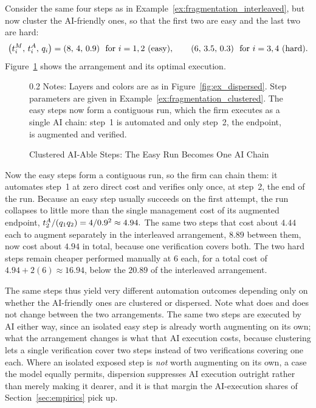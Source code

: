 \begin{example}
\label{ex:fragmentation_clustered}
Consider the same four steps as in Example~\ref{ex:fragmentation_interleaved}, but now cluster the AI-friendly ones, so that the first two are easy and the last two are hard:
\[ \bigl(\manualTime{i},\, \AItime{i},\, q_i\bigr) = (8,\,4,\,0.9) \ \text{ for $i = 1, 2$ (easy)}, \qquad (6,\,3.5,\,0.3) \ \text{ for $i = 3, 4$ (hard)}. \]
Figure~\ref{fig:ex_clustered} shows the arrangement and its optimal execution.
\begin{figure}[!t]
\caption{Clustered AI-Able Steps: The Easy Run Becomes One AI Chain}
\label{fig:ex_clustered}
\centering

\par\vspace{\fignotesskip}
\begin{minipage}{1\linewidth}
\begin{spacing}{0.2}
{\fontsize{9.5pt}{10pt}\selectfont Notes: Layers and colors are as in Figure~\ref{fig:ex_dispersed}. Step parameters are given in Example~\ref{ex:fragmentation_clustered}. The easy steps now form a contiguous run, which the firm executes as a single AI chain: step~1 is automated and only step~2, the endpoint, is augmented and verified.}
\end{spacing}
\end{minipage}
\end{figure}

Now the easy steps form a contiguous run, so the firm can chain them: it automates step~1 at zero direct cost and verifies only once, at step~2, the end of the run.
Because an easy step usually succeeds on the first attempt, the run collapses to little more than the single management cost of its augmented endpoint, $t^{A}_{2}/(q_1 q_2) = 4/0.9^2 \approx 4.94.$
The same two steps that cost about $4.44$ each to augment separately in the interleaved arrangement, $8.89$ between them, now cost about $4.94$ in total, because one verification covers both.
The two hard steps remain cheaper performed manually at $6$ each, for a total cost of $4.94 + 2(6) \approx 16.94$, below the $20.89$ of the interleaved arrangement.
\end{example}

The same steps thus yield very different automation outcomes depending only on whether the AI-friendly ones are clustered or dispersed.
Note what does and does not change between the two arrangements.
The same two steps are executed by AI either way, since an isolated easy step is already worth augmenting on its own; what the arrangement changes is what that AI execution costs, because clustering lets a single verification cover two steps instead of two verifications covering one each.
Where an isolated exposed step is \emph{not} worth augmenting on its own, a case the model equally permits, dispersion suppresses AI execution outright rather than merely making it dearer, and it is that margin the AI-execution shares of Section~\ref{sec:empirics} pick up.


